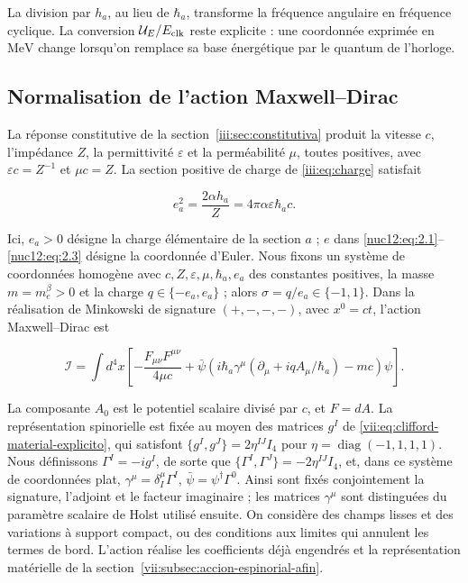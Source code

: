 La division par \(h_a\), au lieu de \(\hbar_a\), transforme la fréquence angulaire en fréquence cyclique. La conversion \(\mathcal U_E/E_{\rm clk}\) reste explicite : une coordonnée exprimée en \(\mathrm{MeV}\) change lorsqu’on remplace sa base énergétique par le quantum de l’horloge.

\subsection{Normalisation de l’action Maxwell--Dirac}

La réponse constitutive de la section~\ref{iii:sec:constitutiva} produit la vitesse \(c\), l’impédance \(Z\), la permittivité \(\varepsilon\) et la perméabilité \(\mu\), toutes positives, avec \(\varepsilon c=Z^{-1}\) et \(\mu c=Z\). La section positive de charge de \eqref{iii:eq:charge} satisfait



\begin{equation}
e_a^2=\frac{2\alpha h_a}{Z}
=4\pi\alpha\varepsilon\hbar_a c .
\label{nuc12:eq:3.1}
\end{equation}



Ici, \(e_a>0\) désigne la charge élémentaire de la section \(a\) ; \(e\) dans \eqref{nuc12:eq:2.1}--\eqref{nuc12:eq:2.3} désigne la coordonnée d’Euler. Nous fixons un système de coordonnées homogène avec \(c,Z,\varepsilon,\mu,\hbar_a,e_a\) des constantes positives, la masse \(m=m_e^\beta>0\) et la charge \(q\in\{-e_a,e_a\}\) ; alors \(\sigma=q/e_a\in\{-1,1\}\). Dans la réalisation de Minkowski de signature \((+,-,-,-)\), avec \(x^0=ct\), l’action Maxwell--Dirac est



\begin{equation}
\mathcal I=\int d^4x\left[
-\frac{F_{\mu\nu}F^{\mu\nu}}{4\mu c}
+\bar\psi\left(i\hbar_a\gamma^\mu
(\partial_\mu+iqA_\mu/\hbar_a)-mc\right)\psi
\right].
\label{nuc12:eq:3.2}
\end{equation}



La composante \(A_0\) est le potentiel scalaire divisé par \(c\), et \(F=dA\). La représentation spinorielle est fixée au moyen des matrices \(g^I\) de \eqref{vii:eq:clifford-material-explicito}, qui satisfont \(\{g^I,g^J\}=2\eta^{IJ}I_4\) pour \(\eta=\operatorname{diag}(-1,1,1,1)\). Nous définissons \(\Gamma^I=-ig^I\), de sorte que \(\{\Gamma^I,\Gamma^J\}=-2\eta^{IJ}I_4\), et, dans ce système de coordonnées plat, \(\gamma^\mu=\delta^\mu_I\Gamma^I\), \(\bar\psi=\psi^\dagger\Gamma^0\). Ainsi sont fixés conjointement la signature, l’adjoint et le facteur imaginaire ; les matrices \(\gamma^\mu\) sont distinguées du paramètre scalaire de Holst utilisé ensuite. On considère des champs lisses et des variations à support compact, ou des conditions aux limites qui annulent les termes de bord. L’action réalise les coefficients déjà engendrés et la représentation matérielle de la section~\ref{vii:subsec:accion-espinorial-afin}.

